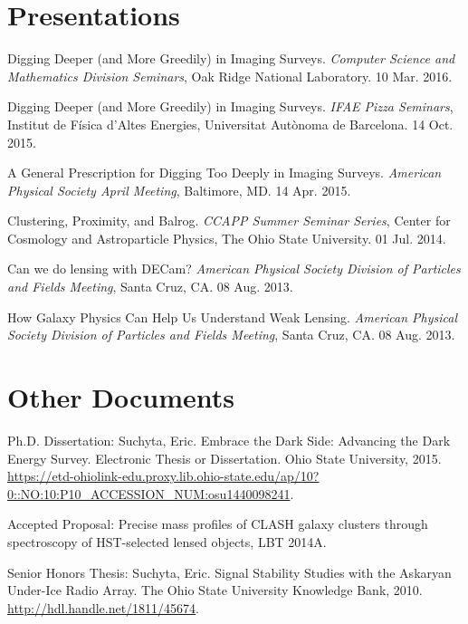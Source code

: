 \documentclass[12pt,a4paper,sans]{moderncv}	%
\begin{document}
\clearpage





\section{Presentations}

\begin{achievements}
\item Digging Deeper (and More Greedily) in Imaging Surveys. \textit{Computer Science and Mathematics Division Seminars}, Oak Ridge National Laboratory. 10 Mar. 2016.
\item Digging Deeper (and More Greedily) in Imaging Surveys. \textit{IFAE Pizza Seminars}, Institut de F\'isica d'Altes Energies, Universitat Aut\`onoma de Barcelona. 14 Oct. 2015.
\item A General Prescription for Digging Too Deeply in Imaging Surveys. \textit{American Physical Society April Meeting}, Baltimore, MD. 14 Apr. 2015.
\item Clustering, Proximity, and Balrog. \textit{CCAPP Summer Seminar Series}, Center for Cosmology and Astroparticle Physics, The Ohio State University. 01 Jul. 2014.
\item Can we do lensing with DECam? \textit{American Physical Society Division of Particles and Fields Meeting}, Santa Cruz, CA. 08 Aug. 2013. 
\item How Galaxy Physics Can Help Us Understand Weak Lensing. \textit{American Physical Society Division of Particles and Fields Meeting}, Santa Cruz, CA. 08 Aug. 2013. 
\end{achievements}


\section{Other Documents}
\begin{achievements}
\item Ph.D. Dissertation: Suchyta, Eric. Embrace the Dark Side: Advancing the Dark Energy Survey. Electronic Thesis or Dissertation. Ohio State University, 2015. \url{https://etd-ohiolink-edu.proxy.lib.ohio-state.edu/ap/10?0::NO:10:P10_ACCESSION_NUM:osu1440098241}.
\item Accepted Proposal: Precise mass profiles of CLASH galaxy clusters through spectroscopy of HST-selected lensed objects, LBT 2014A.
\item Senior Honors Thesis: Suchyta, Eric. Signal Stability Studies with the Askaryan Under-Ice Radio Array. The Ohio State University Knowledge Bank, 2010. \url{http://hdl.handle.net/1811/45674}.
\end{achievements}
\end{document}
